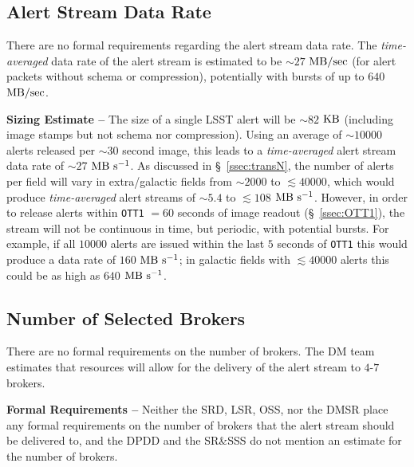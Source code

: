 \documentclass[DM,authoryear,toc]{lsstdoc}
\begin{document}
\subsection{Alert Stream Data Rate}\label{ssec:data_rate}

There are no formal requirements regarding the alert stream data rate. The {\it time-averaged} data rate of the alert stream is estimated to be $\sim27$ $\rm MB/sec$ (for alert packets without schema or compression), potentially with bursts of up to $640$ $\rm MB/sec$.


{\bf Sizing Estimate --} The size of a single LSST alert will be $\sim82$ $\rm KB$ (including image stamps but not schema nor compression). Using an average of $\sim10000$ alerts released per $\sim30$ second image, this leads to a {\it time-averaged} alert stream data rate of  $\sim27$ $\rm MB\ s^{-1}$. As discussed in \S~\ref{ssec:transN}, the number of alerts per field will vary in extra/galactic fields from $\sim2000$ to $\lesssim40000$, which would produce {\it time-averaged} alert streams of $\sim5.4$ to $\lesssim108$ $\rm MB\ s^{-1}$. However, in order to release alerts within {\tt OTT1} $=60$ seconds of image readout (\S~\ref{ssec:OTT1}), the stream will not be continuous in time, but periodic, with potential bursts. For example, if all $10000$ alerts are issued within the last $5$ seconds of {\tt OTT1} this would produce a data rate of $160$ $\rm MB\ s^{-1}$; in galactic fields with $\lesssim40000$ alerts this could be as high as $640$ $\rm MB\ s^{-1}$.


\subsection{Number of Selected Brokers}\label{ssec:num_brokers}

There are no formal requirements on the number of brokers. The DM team estimates that resources will allow for the delivery of the alert stream to $4$-$7$ brokers.

{\bf Formal Requirements --} Neither the SRD, LSR, OSS, nor the DMSR place any formal requirements on the number of brokers that the alert stream should be delivered to, and the DPDD and the SR\&SSS do not mention an estimate for the number of brokers. 
\end{document}
